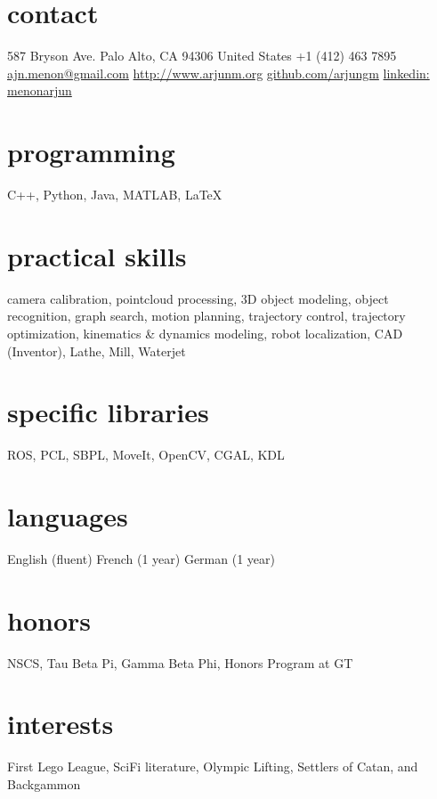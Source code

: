 \documentclass[]{friggeri-cv} %
\begin{document}


\begin{aside} %
\section{contact}
587 Bryson Ave.
Palo Alto, CA 94306
United States
+1 (412) 463 7895
~
\href{mailto:ajn.menon@gmail.com}{ajn.menon@gmail.com}
\href{http://www.arjunm.org}{http://www.arjunm.org}
\href{http://www.github.com/arjungm}{github.com/arjungm}
\href{https://www.linkedin.com/in/menonarjun}{linkedin: menonarjun}
\section{programming}
C++, Python, 
Java, MATLAB, LaTeX
\section{practical skills}
camera calibration,
pointcloud processing,
3D object modeling,
object recognition,
graph search,
motion planning,
trajectory control,
trajectory optimization,
kinematics \& dynamics modeling,
robot localization,
CAD (Inventor),
Lathe, Mill, Waterjet
\section{specific libraries}
ROS, PCL, SBPL,
MoveIt, OpenCV, 
CGAL, KDL
\section{languages}
English (fluent)
French (1 year)
German (1 year)
\section{honors}
NSCS, Tau Beta Pi, 
Gamma Beta Phi, 
Honors Program at GT
\section{interests}
First Lego League,
SciFi literature, 
Olympic Lifting,
Settlers of Catan,
and Backgammon
\end{aside}
\end{document}

